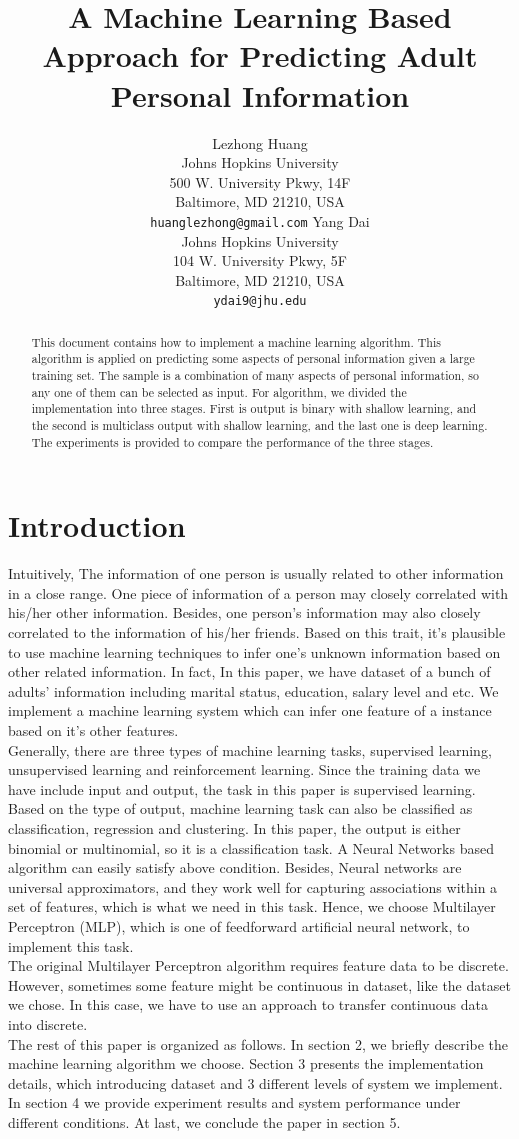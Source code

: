 \documentclass[11pt,letterpaper]{article}
\title{ A Machine Learning Based Approach for Predicting Adult Personal Information}
\author{Lezhong Huang\\
  Johns Hopkins University\\
  500 W. University Pkwy, 14F\\
  Baltimore, MD 21210, USA\\
  {\tt huanglezhong@gmail.com}
  \And
  Yang Dai \\
  Johns Hopkins University \\
  104 W. University Pkwy, 5F\\
  Baltimore, MD 21210, USA\\
  {\tt ydai9@jhu.edu}}
\date{}
\begin{document}
\maketitle
\begin{abstract}
This document contains how to implement a machine learning algorithm. This algorithm is applied on predicting some aspects of personal information given a large training set. The sample is a combination of many aspects of personal information, so any one of them can be selected as input. For algorithm, we divided the implementation into three stages. First is output is binary with shallow learning, and the second is multiclass output with shallow learning, and the last one is deep learning. The experiments is provided to compare the performance of the three stages.
\end{abstract}

\section{Introduction}
Intuitively, The information of one person is usually related to other information in a close range. One piece of information of a person may closely correlated with his/her other information. Besides, one person's information may also closely correlated to the information of his/her friends. Based on this trait, it's plausible to use machine learning techniques to infer one's unknown information based on other related information. In fact, 
In this paper, we have dataset of a bunch of adults' information including marital status, education, salary level and etc. We implement a machine learning system which can infer one feature of a instance based on it's other features.
\\
Generally, there are three types of machine learning tasks, supervised learning, unsupervised learning and reinforcement learning. Since the training data we have include input and output, the task in this paper is supervised learning. Based on the type of output, machine learning task can also be classified as classification, regression and clustering. In this paper, the output is either binomial or multinomial, so it is a classification task. A Neural Networks based algorithm can easily satisfy above condition. Besides, Neural networks are universal approximators, and they work well for capturing associations within a set of features, which is what we need in this task. Hence, we choose Multilayer Perceptron (MLP), which is one of feedforward artificial neural network, to implement this task.
\\
The original Multilayer Perceptron algorithm requires feature data to be discrete. However, sometimes some feature might be continuous in dataset, like the dataset we chose. In this case, we have to use an approach to transfer continuous data into discrete.
\\
The rest of this paper is organized as follows. In section 2, we briefly describe the machine learning algorithm we choose. Section 3 presents the implementation details, which introducing dataset and 3 different levels of system we implement. In section 4 we provide experiment results and system performance under different conditions. At last, we conclude the paper in section 5.
\end{document}

